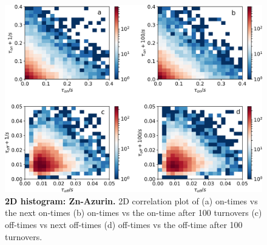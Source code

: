 \begin{figure}
  \centering
  \includegraphics[width=\textwidth,keepaspectratio]{Figure_SI/SI_on_off_2D_histogram_Zn.png}
	\makeatletter
	\renewcommand{\fnum@figure}{\figurename~S\thefigure}
	\makeatother
  \caption{\textbf{2D histogram: Zn-Azurin.} 2D correlation plot of (a) on-times vs the next on-times (b) on-times vs the on-time after 100 turnovers (c) off-times vs next off-times (d) off-times vs the off-time after 100 turnovers.}
  \label{SIfig:tracecomparision}
\end{figure}